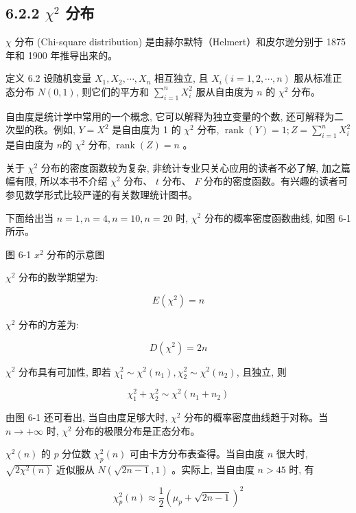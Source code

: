 \documentclass[10pt]{article}
\begin{document}
\begin{CJK*}{UTF8}{bsmi}
\subsection*{6.2.2 $\chi^{2}$ 分布}
$\chi$ 分布 (Chi-square distribution) 是由赫尔默特（Helmert）和皮尔逊分别于 1875 年和 1900 年推导出来的。

定义 6.2 设随机变量 $X_{1}, X_{2}, \cdots, X_{n}$ 相互独立, 且 $X_{i}(i=1,2, \cdots, n)$ 服从标准正态分布 $N(0,1)$, 则它们的平方和 $\sum_{i=1}^{n} X_{i}^{2}$ 服从自由度为 $n$ 的 $\chi^{2}$ 分布。

自由度是统计学中常用的一个概念, 它可以解释为独立变量的个数, 还可解释为二次型的秩。例如, $Y=X^{2}$ 是自由度为 1 的 $\chi^{2}$ 分布, $\operatorname{rank}(Y)=1 ; Z=\sum_{i=1}^{n} X_{i}^{2}$ 是自由度为 $n$的 $\chi^{2}$ 分布, $\operatorname{rank}(Z)=n$ 。

关于 $\chi^{2}$ 分布的密度函数较为复杂, 非统计专业只关心应用的读者不必了解, 加之篇幅有限, 所以本书不介绍 $\chi^{2}$ 分布、 $t$ 分布、 $F$ 分布的密度函数。有兴趣的读者可参见数学形式比较严谨的有关数理统计图书。

下面给出当 $n=1, n=4, n=10, n=20$ 时, $\chi^{2}$ 分布的概率密度函数曲线, 如图 6-1 所示。

\begin{center}
\end{center}

图 6-1 $x^{2}$ 分布的示意图

$\chi^{2}$ 分布的数学期望为:

$$
E\left(\chi^{2}\right)=n
$$

$\chi^{2}$ 分布的方差为:

$$
D\left(\chi^{2}\right)=2 n
$$

$\chi^{2}$ 分布具有可加性, 即若 $\chi_{1}^{2} \sim \chi^{2}\left(n_{1}\right), \chi_{2}^{2} \sim \chi^{2}\left(n_{2}\right)$, 且独立, 则

$$
\chi_{1}^{2}+\chi_{2}^{2} \sim \chi^{2}\left(n_{1}+n_{2}\right)
$$

由图 6-1 还可看出, 当自由度足够大时, $\chi^{2}$ 分布的概率密度曲线趋于对称。当 $n \rightarrow+\infty$ 时, $\chi^{2}$ 分布的极限分布是正态分布。

$\chi^{2}(n)$ 的 $p$ 分位数 $\chi_{p}^{2}(n)$ 可由卡方分布表查得。当自由度 $n$ 很大时, $\sqrt{2 \chi^{2}(n)}$ 近似服从 $N(\sqrt{2 n-1}, 1)$ 。实际上, 当自由度 $n>45$ 时, 有


\begin{equation*}
\chi_{p}^{2}(n) \approx \frac{1}{2}\left(\mu_{p}+\sqrt{2 n-1}\right)^{2} \tag{6.1}
\end{equation*}



\end{CJK*}
\end{document}
